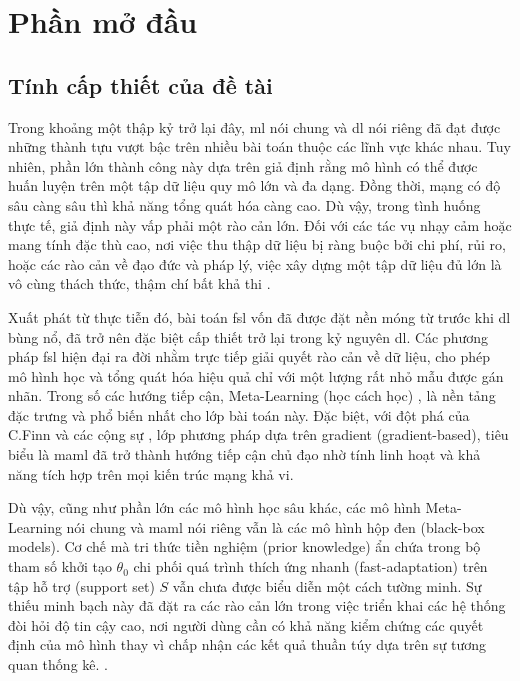 \chapter{Phần mở đầu}
\label{Chapter1}

\section{Tính cấp thiết của đề tài}
\label{sec:research_urgency}

Trong khoảng một thập kỷ trở lại đây, \acrfull{ml} nói chung và \acrfull{dl} nói riêng đã đạt được những thành tựu vượt bậc trên nhiều bài toán thuộc các lĩnh vực khác nhau. Tuy nhiên, phần lớn thành công này dựa trên giả định rằng mô hình có thể được huấn luyện trên một tập dữ liệu quy mô lớn và đa dạng. Đồng thời, mạng có độ sâu càng sâu thì khả năng tổng quát hóa càng cao. Dù vậy, trong tình huống thực tế, giả định này vấp phải một rào cản lớn. Đối với các tác vụ nhạy cảm hoặc mang tính đặc thù cao, nơi việc thu thập dữ liệu bị ràng buộc bởi chi phí, rủi ro, hoặc các rào cản về đạo đức và pháp lý, việc xây dựng một tập dữ liệu đủ lớn là vô cùng thách thức, thậm chí bất khả thi \cite{wang2020generalizing, fawakherji2026learning}.

Xuất phát từ thực tiễn đó, bài toán \acrfull{fsl} vốn đã được đặt nền móng từ trước khi \acrlong{dl} bùng nổ, đã trở nên đặc biệt cấp thiết trở lại trong kỷ nguyên \acrlong{dl}. Các phương pháp \acrlong{fsl} hiện đại ra đời nhằm trực tiếp giải quyết rào cản về dữ liệu, cho phép mô hình học và tổng quát hóa hiệu quả chỉ với một lượng rất nhỏ mẫu được gán nhãn. Trong số các hướng tiếp cận, Meta-Learning (học cách học) \cite{schmidhuber1987evolutionary, bengio2013optimization}, là nền tảng đặc trưng và phổ biến nhất cho lớp bài toán này. Đặc biệt, với đột phá của C.Finn và các cộng sự \cite{finn2017model}, lớp phương pháp dựa trên gradient (gradient-based), tiêu biểu là \acrfull{maml} đã trở thành hướng tiếp cận chủ đạo nhờ tính linh hoạt và khả năng tích hợp trên mọi kiến trúc mạng khả vi.

Dù vậy, cũng như phần lớn các mô hình học sâu khác, các mô hình Meta-Learning nói chung và \acrshort{maml} nói riêng vẫn là các mô hình hộp đen (black-box models). Cơ chế mà tri thức tiền nghiệm (prior knowledge) ẩn chứa trong bộ tham số khởi tạo $\theta_0$ chi phối quá trình thích ứng nhanh (fast-adaptation) trên tập hỗ trợ (support set) $S$ vẫn chưa được biểu diễn một cách tường minh. Sự thiếu minh bạch này đã đặt ra các rào cản lớn trong việc triển khai các hệ thống đòi hỏi độ tin cậy cao, nơi người dùng cần có khả năng kiểm chứng các quyết định của mô hình thay vì chấp nhận các kết quả thuần túy dựa trên sự tương quan thống kê. \cite{lum2016predict, angwin2016machine}.

